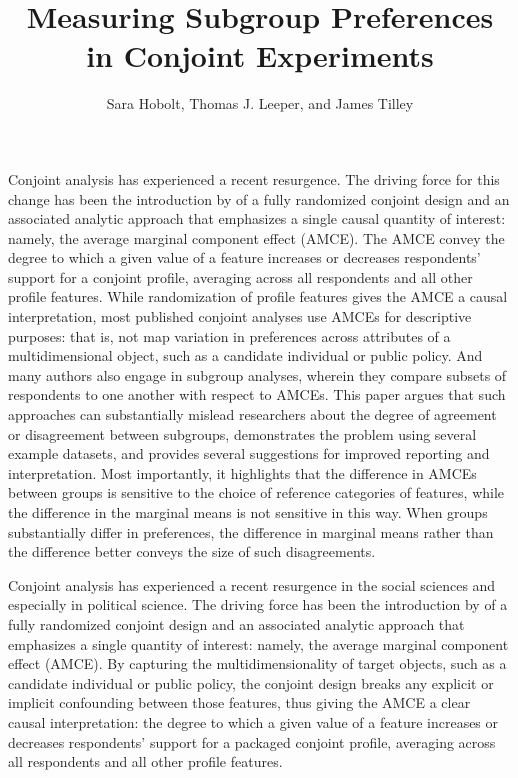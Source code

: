 \documentclass[a4paper,12pt]{article}\usepackage[]{graphicx}\usepackage[]{color}
\title{Measuring Subgroup Preferences in Conjoint Experiments}
\author{Sara Hobolt, Thomas J. Leeper, and James Tilley}
\begin{document}
\maketitle

{\abstract Conjoint analysis has experienced a recent resurgence. The driving force for this change has been the introduction by \citet{HainmuellerHopkinsYamamoto2014} of a fully randomized conjoint design and an associated analytic approach that emphasizes a single causal quantity of interest: namely, the average marginal component effect (AMCE). The AMCE convey the degree to which a given value of a feature increases or decreases respondents' support for a conjoint profile, averaging across all respondents and all other profile features. While randomization of profile features gives the AMCE a causal interpretation, most published conjoint analyses use AMCEs for descriptive purposes: that is, not map variation in preferences across attributes of a multidimensional object, such as a candidate individual or public policy. And many authors also engage in subgroup analyses, wherein they compare subsets of respondents to one another with respect to AMCEs. This paper argues that such approaches can substantially mislead researchers about the degree of agreement or disagreement between subgroups, demonstrates the problem using several example datasets, and provides several suggestions for improved reporting and interpretation. Most importantly, it highlights that the difference in AMCEs between groups is sensitive to the choice of reference categories of features, while the difference in the marginal means is not sensitive in this way. When groups substantially differ in preferences, the difference in marginal means rather than the difference better conveys the size of such disagreements.}










\clearpage


Conjoint analysis has experienced a recent resurgence in the social sciences and especially in political science. The driving force has been the introduction by \citet{HainmuellerHopkinsYamamoto2014} of a fully randomized conjoint design and an associated analytic approach that emphasizes a single quantity of interest: namely, the average marginal component effect (AMCE). By capturing the multidimensionality of target objects, such as a candidate individual or public policy, the conjoint design breaks any explicit or implicit confounding between those features, thus giving the AMCE a clear causal interpretation: the degree to which a given value of a feature increases or decreases respondents' support for a packaged conjoint profile, averaging across all respondents and all other profile features.
\end{document}
